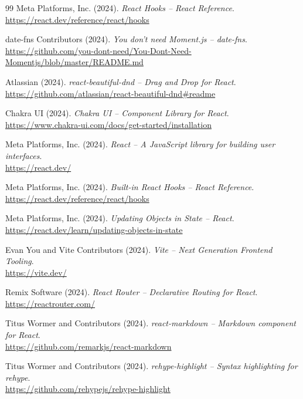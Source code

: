 \begin{thebibliography}{99}
Meta Platforms, Inc. (2024).
\textit{React Hooks -- React Reference}.\\
\url{https://react.dev/reference/react/hooks}

date-fns Contributors (2024).
\textit{You don't need Moment.js -- date-fns}.\\
\url{https://github.com/you-dont-need/You-Dont-Need-Momentjs/blob/master/README.md}

Atlassian (2024).
\textit{react-beautiful-dnd -- Drag and Drop for React}.\\
\url{https://github.com/atlassian/react-beautiful-dnd\#readme}

Chakra UI (2024).
\textit{Chakra UI -- Component Library for React}.\\
\url{https://www.chakra-ui.com/docs/get-started/installation}


Meta Platforms, Inc. (2024).
\textit{React -- A JavaScript library for building user interfaces}.\\
\url{https://react.dev/}

Meta Platforms, Inc. (2024).
\textit{Built-in React Hooks -- React Reference}.\\
\url{https://react.dev/reference/react/hooks}

Meta Platforms, Inc. (2024).
\textit{Updating Objects in State -- React}.\\
\url{https://react.dev/learn/updating-objects-in-state}

Evan You and Vite Contributors (2024).
\textit{Vite -- Next Generation Frontend Tooling}.\\
\url{https://vite.dev/}

Remix Software (2024).
\textit{React Router -- Declarative Routing for React}.\\
\url{https://reactrouter.com/}

Titus Wormer and Contributors (2024).
\textit{react-markdown -- Markdown component for React}.\\
\url{https://github.com/remarkjs/react-markdown}

Titus Wormer and Contributors (2024).
\textit{rehype-highlight -- Syntax highlighting for rehype}.\\
\url{https://github.com/rehypejs/rehype-highlight}


\end{thebibliography}
